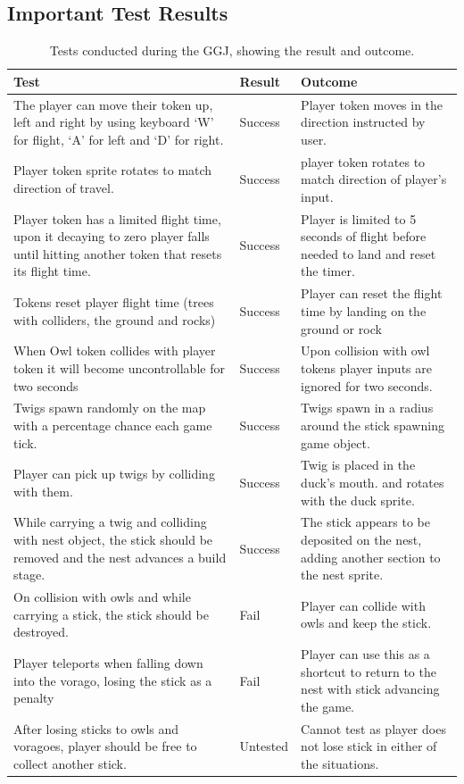 \documentclass[12pt]{article}
\begin{document}
\subsection{Important Test Results}
\begin{table}[H]
\centering
\begin{tabular}{| p{6cm} | p{1.5cm} | p{6cm} |}
     \hline
     \bf Test & \bf Result & \bf Outcome\\ \hline
     The player can move their token up, left and right by using keyboard `W' for flight, `A' for left and `D' for right. & Success & Player token moves in the direction instructed by user. \\ \hline
     Player token sprite rotates to match direction of travel.& Success & player token rotates to match direction of player's input. \\ \hline
     Player token has a limited flight time, upon it decaying to zero player falls until hitting another token that resets its flight time.& Success & Player is limited to 5 seconds of flight before needed to land and reset the timer.\\ \hline
     Tokens reset player flight time (trees with colliders, the ground and rocks) & Success & Player can reset the flight time by landing on the ground or rock \\ \hline
     When Owl token collides with player token it will become uncontrollable for two seconds& Success & Upon collision with owl tokens player inputs are ignored for two seconds.\\ \hline
     Twigs spawn randomly on the map with a percentage chance each game tick. & Success & Twigs spawn in a radius around the stick spawning game object. \\ \hline
     Player can pick up twigs by colliding with them.& Success & Twig is placed in the duck's mouth. and rotates with the duck sprite.\\ \hline
     While carrying a twig and colliding with nest object, the stick should be removed and the nest advances a build stage.& Success & The stick appears to be deposited on the nest, adding another section to the nest sprite. \\ \hline
     On collision with owls and while carrying a stick, the stick should be destroyed.& Fail & Player can collide with owls and keep the stick. \\ \hline
     Player teleports when falling down into the vorago, losing the stick as a penalty& Fail& Player can use this as a shortcut to return to the nest with stick advancing the game.\\ \hline     
     After losing sticks to owls and voragoes, player should be free to collect another stick.& Untested & Cannot test as player does not lose stick in either of the situations. \\ \hline
     
\end{tabular}
\caption{Tests conducted during the GGJ, showing the result and outcome.}
\label{tab:ggjtestingtable}
\end{table}
\end{document}
